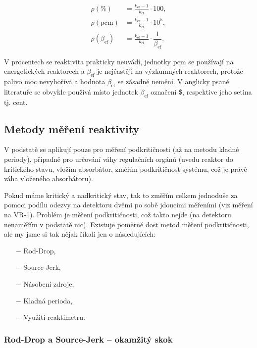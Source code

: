 \begin{align*}
    \rho (\%) &= \frac{k_{\text{ef}} - 1}{k_{\text{ef}}} \cdot 100, \\
    \rho (\text{pcm}) &= \frac{k_{\text{ef}} - 1}{k_{\text{ef}}} \cdot 10^5, \\
    \rho (\beta_{\text{ef}}) &= \frac{k_{\text{ef}} - 1}{k_{\text{ef}}}\cdot \dfrac{1}{\beta_\text{ef}}.
\end{align*}

V procentech se reaktivita prakticky neuvádí, jednotky pcm se používají na energetických reaktorech a $\beta_\text{ef}$ je nejčastěji na výzkumných reaktorech, protože palivo moc nevyhořívá a hodnota $\beta_\text{ef}$ se zásadně nemění. V anglicky psané literatuře se obvykle používá místo jednotek $\beta_{\text{ef}}$ označení \$, respektive jeho setina tj. cent.

\subsection{Metody měření reaktivity}

V podstatě se aplikují pouze pro měření podkritičnosti (až na metodu kladné periody), případně pro určování váhy regulačních orgánů (uvedu reaktor do kritického stavu, vložím absorbátor, změřím podkritičnost systému, což je právě váha vloženého absorbátoru). 

Pokud máme kritický a nadkritický stav, tak to změřím celkem jednoduše za pomoci podílu odezvy na detektoru dvěmi po sobě jdoucími měřeními (viz měření na VR-1). Problém je měření podkritičnosti, což takto nejde (na detektoru nenaměřím v podstatě nic). Existuje poměrně dost metod měření podkritičnosti, ale my jsme si tak nějak říkali jen o následujících:

\begin{itemize}%
    \item[$-$] Rod-Drop,
    \item[$-$] Source-Jerk,
    \item[$-$] Násobení zdroje,
    \item[$-$] Kladná perioda,
    \item[$-$] Využití reaktimetru.
\end{itemize}

\subsubsection{Rod-Drop a Source-Jerk -- okamžitý skok}

